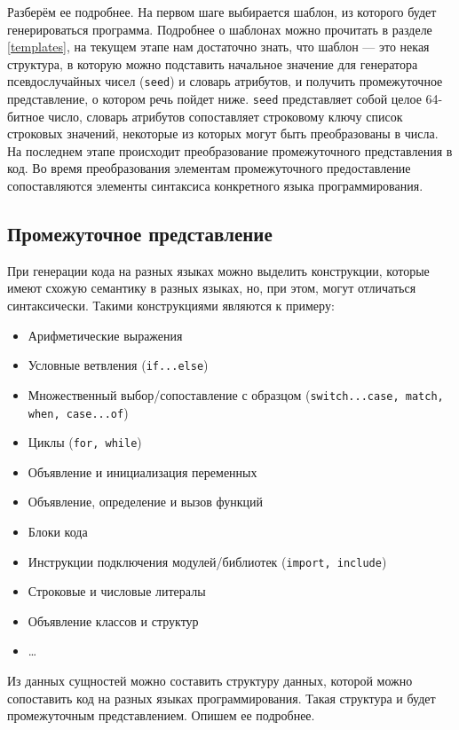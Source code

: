 Разберём ее подробнее. На первом шаге выбирается шаблон, из которого будет генерироваться
программа. Подробнее о шаблонах можно прочитать в разделе \ref{templates}, на текущем этапе нам достаточно
знать, что шаблон --- это некая структура, в которую можно подставить начальное значение для
генератора псевдослучайных чисел (\texttt{seed}) и словарь атрибутов, и получить промежуточное
представление, о котором речь пойдет ниже. \texttt{seed} представляет собой целое
64-битное число, словарь атрибутов сопоставляет строковому ключу список строковых значений,
некоторые из которых могут быть преобразованы в числа.
На последнем этапе происходит преобразование промежуточного представления в код. Во время преобразования
элементам промежуточного предоставление сопоставляются элементы синтаксиса конкретного языка программирования.


\subsection{Промежуточное представление}
При генерации кода на разных языках можно выделить конструкции, которые имеют схожую
семантику в разных языках, но, при этом, могут отличаться синтаксически. Такими
конструкциями являются к примеру:

\begin{itemize}
    \item Арифметические выражения
    \item Условные ветвления (\texttt{if...else})
    \item Множественный выбор/сопоставление с образцом (\texttt{switch...case, match, when, case...of})
    \item Циклы (\texttt{for, while})
    \item Объявление и инициализация переменных
    \item Объявление, определение и вызов функций
    \item Блоки кода
    \item Инструкции подключения модулей/библиотек (\texttt{import, include})
    \item Строковые и числовые литералы
    \item Объявление классов и структур
    \item \dots
\end{itemize}
\label{syntax-items}

Из данных сущностей можно составить структуру данных, которой можно сопоставить код
на разных языках программирования. Такая структура и будет промежуточным представлением.
Опишем ее подробнее.

